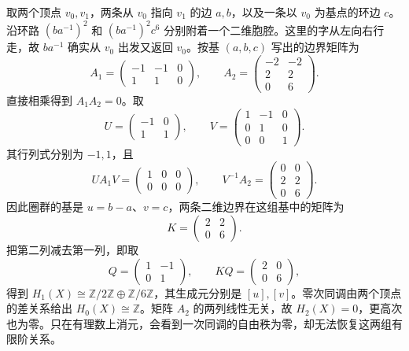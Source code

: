 \begin{example}\label{g2:exm:integer-matrix-certificate}
	取两个顶点 \(v_0,v_1\)，两条从 \(v_0\) 指向 \(v_1\) 的边 \(a,b\)，以及一条以 \(v_0\) 为基点的环边 \(c\)。沿环路 \((ba^{-1})^2\) 和 \((ba^{-1})^2c^6\) 分别附着一个二维胞腔。这里的字从左向右行走，故 \(ba^{-1}\) 确实从 \(v_0\) 出发又返回 \(v_0\)。按基 \((a,b,c)\) 写出的边界矩阵为
	\[
		A_1=\begin{pmatrix}-1&-1&0\\1&1&0\end{pmatrix},
		\qquad
		A_2=\begin{pmatrix}-2&-2\\2&2\\0&6\end{pmatrix}.
	\]
	直接相乘得到 \(A_1A_2=0\)。取
	\[
		U=\begin{pmatrix}-1&0\\1&1\end{pmatrix},
		\qquad
		V=\begin{pmatrix}1&-1&0\\0&1&0\\0&0&1\end{pmatrix}.
	\]
	其行列式分别为 \(-1,1\)，且
	\[
		UA_1V=\begin{pmatrix}1&0&0\\0&0&0\end{pmatrix},
		\qquad
		V^{-1}A_2=\begin{pmatrix}0&0\\2&2\\0&6\end{pmatrix}.
	\]
	因此圈群的基是 \(u=b-a\)、\(v=c\)，两条二维边界在这组基中的矩阵为
	\[
		K=\begin{pmatrix}2&2\\0&6\end{pmatrix}.
	\]
	把第二列减去第一列，即取
	\[
		Q=\begin{pmatrix}1&-1\\0&1\end{pmatrix},\qquad
		KQ=\begin{pmatrix}2&0\\0&6\end{pmatrix},
	\]
	得到 \(H_1(X)\cong\mathbb Z/2\mathbb Z\oplus\mathbb Z/6\mathbb Z\)，其生成元分别是 \([u],[v]\)。零次同调由两个顶点的差关系给出 \(H_0(X)\cong\mathbb Z\)。矩阵 \(A_2\) 的两列线性无关，故 \(H_2(X)=0\)，更高次也为零。只在有理数上消元，会看到一次同调的自由秩为零，却无法恢复这两组有限阶关系。
\end{example}

